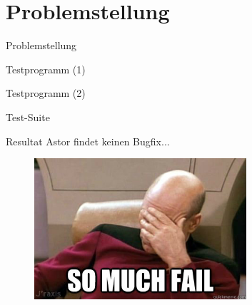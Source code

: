 \section{Problemstellung}
%
\begin{frame}{}
	\begin{center}
		\huge{Problemstellung}
	\end{center}
\end{frame}
%
\begin{frame}{Testprogramm (1)}
	\begin{figure}
		\begin{center}
			\scalebox{0.74}{
				\begin{minipage}{25em}
					
				\end{minipage}
			}
		\end{center}
	\end{figure}
\end{frame}
%
\begin{frame}{Testprogramm (2)}
	\begin{figure}
		\begin{center}
	\end{center}
	\end{figure}
\end{frame}
%
\begin{frame}{Test-Suite}
	\begin{figure}
			\scalebox{0.76}{
				
			}
	\end{figure}
\end{frame}
%
\begin{frame}{Resultat}
	Astor findet keinen Bugfix...
	\begin{figure}
		\includegraphics[width=0.7\textwidth]{img/facepalm.jpg}
	\end{figure}
\end{frame}
